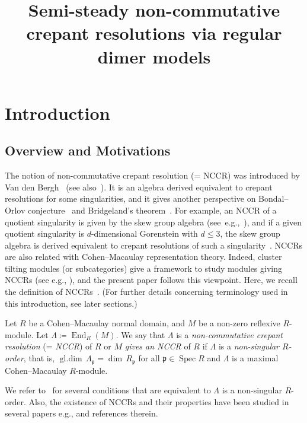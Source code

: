 \documentclass[ALCO,ThmDefs,Unicode]{cedram}
\title[Semi-steady NCCRs via regular dimer models]{Semi-steady non-commutative crepant resolutions via regular dimer models}
\author[\initial{Y.} Nakajima]{\firstname{Yusuke} \lastname{Nakajima}}
\newcommand{\fkp}{\mathfrak{p}}
\DeclareMathOperator{\Spec}{Spec}
\DeclareMathOperator{\End}{End}
\DeclareMathOperator{\gldim}{gl.dim}
\begin{document}
\maketitle

\section{Introduction}

\subsection{Overview and Motivations}

The notion of non-commutative crepant resolution (= NCCR) was introduced by Van den Bergh~\cite{VdB2} (see also~\cite{VdB1}). It is an algebra derived equivalent to crepant resolutions for some singularities, and it gives another perspective on Bondal--Orlov conjecture~\cite{BO} and Bridgeland's theorem~\cite{Bri}. For example, an NCCR of a quotient singularity is given by the skew group algebra (see~e.g.,~\cite{Iya,IW2,VdB2}), and if a given quotient singularity is $d$-dimensional Gorenstein with $d\le 3$, the skew group algebra is derived equivalent to crepant resolutions of such a singularity~\cite{BKR,KV}. NCCRs are also related with Cohen--Macaulay representation theory. Indeed, cluster tilting modules (or subcategories) give a framework to study modules giving NCCRs (see e.g., \cite{DH,Iya,IR,IW2,IW4}), and the present paper follows this viewpoint. Here, we recall the definition of NCCRs~\cite{VdB2}. (For further details concerning terminology used in this introduction, see later sections.)

\begin{defi}\label{NCCR_def}
Let $R$ be a Cohen--Macaulay normal domain, and $M$ be a non-zero reflexive $R$-module. Let $\Lambda\coloneqq\End_R(M)$. We say that $\Lambda$ is a \emph{non-commutative crepant resolution} (= \emph{NCCR}) of $R$ or $M$ \emph{gives an NCCR} of $R$ if $\Lambda$ is a \emph{non-singular $R$-order}, that is, $\gldim\,\Lambda_\fkp=\dim\,R_\fkp$ for all $\fkp\in\Spec R$ and $\Lambda$ is a maximal Cohen--Macaulay $R$-module.
\end{defi}

We refer to~\cite[Proposition~2.17]{IW2} for several conditions that are equivalent to $\Lambda$ is a non-singular $R$-order. Also, the existence of NCCRs and their properties have been studied in several papers e.g., \cite{Bro,BLVdB,BIKR,Dao,DFI,HN,IU2,IW1,IW2,IW4,Leu2,SpVdB,Wem} and references therein.
\end{document}
